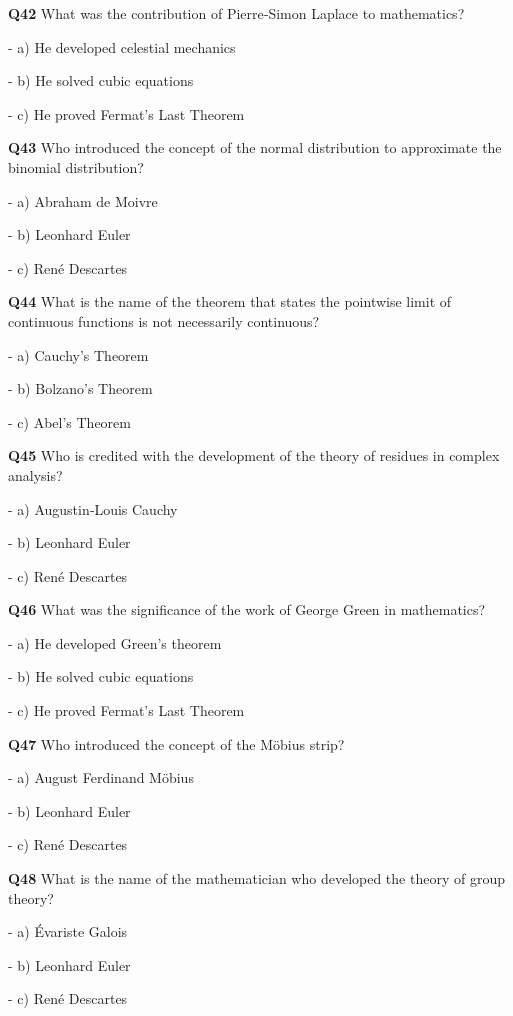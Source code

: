 \textbf{Q42} What was the contribution of Pierre‑Simon Laplace to mathematics?\par
\quad - a) He developed celestial mechanics\par
\quad - b) He solved cubic equations\par
\quad - c) He proved Fermat's Last Theorem\par

\textbf{Q43} Who introduced the concept of the normal distribution to approximate the binomial distribution?\par
\quad - a) Abraham de Moivre\par
\quad - b) Leonhard Euler\par
\quad - c) René Descartes\par

\textbf{Q44} What is the name of the theorem that states the pointwise limit of continuous functions is not necessarily continuous?\par
\quad - a) Cauchy's Theorem\par
\quad - b) Bolzano's Theorem\par
\quad - c) Abel's Theorem\par

\textbf{Q45} Who is credited with the development of the theory of residues in complex analysis?\par
\quad - a) Augustin‑Louis Cauchy\par
\quad - b) Leonhard Euler\par
\quad - c) René Descartes\par

\textbf{Q46} What was the significance of the work of George Green in mathematics?\par
\quad - a) He developed Green's theorem\par
\quad - b) He solved cubic equations\par
\quad - c) He proved Fermat's Last Theorem\par

\textbf{Q47} Who introduced the concept of the Möbius strip?\par
\quad - a) August Ferdinand Möbius\par
\quad - b) Leonhard Euler\par
\quad - c) René Descartes\par

\textbf{Q48} What is the name of the mathematician who developed the theory of group theory?\par
\quad - a) Évariste Galois\par
\quad - b) Leonhard Euler\par
\quad - c) René Descartes\par

